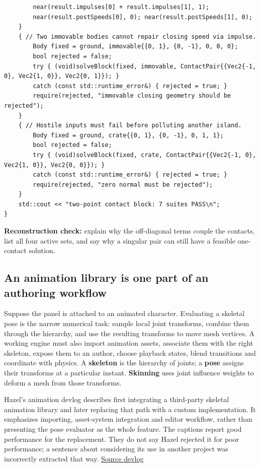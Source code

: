 \begin{verbatim}
        near(result.impulses[0] + result.impulses[1], 1);
        near(result.postSpeeds[0], 0); near(result.postSpeeds[1], 0);
    }
    { // Two immovable bodies cannot repair closing speed via impulse.
        Body fixed = ground, immovable{{0, 1}, {0, -1}, 0, 0, 0};
        bool rejected = false;
        try { (void)solveBlock(fixed, immovable, ContactPair{{Vec2{-1, 0}, Vec2{1, 0}}, Vec2{0, 1}}); }
        catch (const std::runtime_error&) { rejected = true; }
        require(rejected, "immovable closing geometry should be rejected");
    }
    { // Hostile inputs must fail before polluting another island.
        Body fixed = ground, crate{{0, 1}, {0, -1}, 0, 1, 1};
        bool rejected = false;
        try { (void)solveBlock(fixed, crate, ContactPair{{Vec2{-1, 0}, Vec2{1, 0}}, Vec2{0, 0}}); }
        catch (const std::runtime_error&) { rejected = true; }
        require(rejected, "zero normal must be rejected");
    }
    std::cout << "two-point contact block: 7 suites PASS\n";
}
\end{verbatim}

\textbf{Reconstruction check:} explain why the off-diagonal terms couple the contacts, list all four active sets, and say why a singular pair can still have a feasible one-contact solution.

\subsection{An animation library is one part of an authoring workflow}\label{06-engine-ii-ch040-an-animation-library-is-one-part-of-an-authoring-workflow}

\hypertarget{06-engine-ii-ch040-an-animation-library-is-one-part-of-an-authoring-workflow}{}

Suppose the panel is attached to an animated character. Evaluating a skeletal pose is the narrow numerical task: sample local joint transforms, combine them through the hierarchy, and use the resulting transforms to move mesh vertices. A working engine must also import animation assets, associate them with the right skeleton, expose them to an author, choose playback states, blend transitions and coordinate with physics. A \textbf{skeleton} is the hierarchy of joints; a \textbf{pose} assigns their transforms at a particular instant. \textbf{Skinning} uses joint influence weights to deform a mesh from those transforms.

Hazel's animation devlog describes first integrating a third-party skeletal animation library and later replacing that path with a custom implementation. It emphasizes importing, asset-system integration and editor workflow, rather than presenting the pose evaluator as the whole feature. The captions report good performance for the replacement. They do not say Hazel rejected it for poor performance; a sentence about considering its use in another project was incorrectly extracted that way. \href{https://www.youtube.com/watch?v=HPZo1oFESYQ}{Source devlog}

